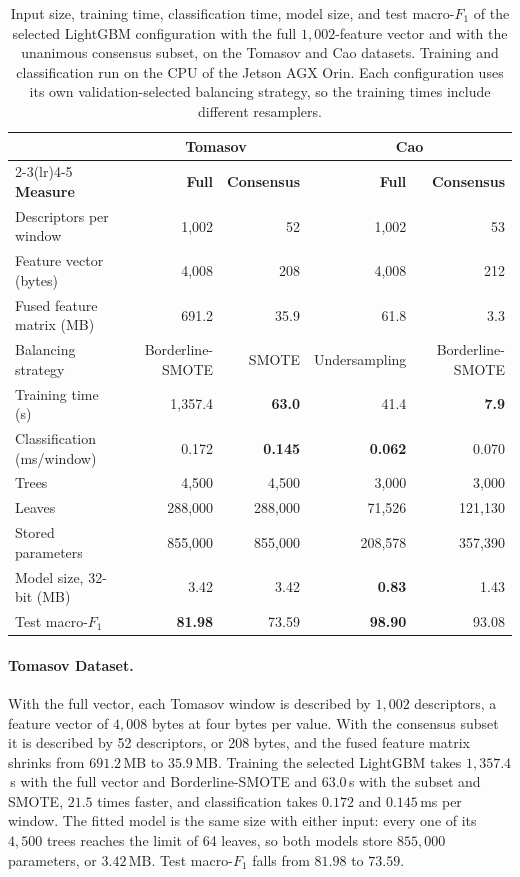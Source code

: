 \begin{table}[!htbp]
	\centering
	\caption{Input size, training time, classification time, model size, and test macro-$F_1$ of the selected LightGBM configuration with the full $1{,}002$-feature vector and with the unanimous consensus subset, on the Tomasov and Cao datasets. Training and classification run on the CPU of the Jetson AGX Orin. Each configuration uses its own validation-selected balancing strategy, so the training times include different resamplers.}
	\label{tab:selection_footprint}
	\footnotesize
	\setlength{\tabcolsep}{3.5pt}
	\begin{tabular}{@{}lrrrr@{}}
		\toprule
		& \multicolumn{2}{c}{\textbf{Tomasov}} & \multicolumn{2}{c}{\textbf{Cao}}\\
		\cmidrule(lr){2-3}\cmidrule(lr){4-5}
		\textbf{Measure} & \textbf{Full} & \textbf{Consensus} & \textbf{Full} & \textbf{Consensus}\\
		\midrule
		Descriptors per window      & 1{,}002 & 52 & 1{,}002 & 53\\
		Feature vector (bytes)      & 4{,}008 & 208 & 4{,}008 & 212\\
		Fused feature matrix (MB)   & 691.2 & 35.9 & 61.8 & 3.3\\
		Balancing strategy          & Borderline-SMOTE & SMOTE & Undersampling & Borderline-SMOTE\\
		Training time (s)           & 1{,}357.4 & \textbf{63.0} & 41.4 & \textbf{7.9}\\
		Classification (ms/window) & 0.172 & \textbf{0.145} & \textbf{0.062} & 0.070\\
		Trees                       & 4{,}500 & 4{,}500 & 3{,}000 & 3{,}000\\
		Leaves                      & 288{,}000 & 288{,}000 & 71{,}526 & 121{,}130\\
		Stored parameters           & 855{,}000 & 855{,}000 & 208{,}578 & 357{,}390\\
		Model size, 32-bit (MB)            & 3.42 & 3.42 & \textbf{0.83} & 1.43\\
		Test macro-$F_1$                   & \textbf{81.98} & 73.59 & \textbf{98.90} & 93.08\\
		\bottomrule
	\end{tabular}
\end{table}

\paragraph[Tomasov Dataset]{Tomasov Dataset.}
With the full vector, each Tomasov window is described by $1{,}002$ descriptors, a feature vector of $4{,}008$ bytes at four bytes per value. With the consensus subset it is described by 52 descriptors, or 208 bytes, and the fused feature matrix shrinks from $691.2$\,MB to $35.9$\,MB. Training the selected LightGBM takes $1{,}357.4$\,s with the full vector and Borderline-SMOTE and $63.0$\,s with the subset and SMOTE, $21.5$ times faster, and classification takes $0.172$ and $0.145$\,ms per window. The fitted model is the same size with either input: every one of its $4{,}500$ trees reaches the limit of 64 leaves, so both models store $855{,}000$ parameters, or $3.42$\,MB. Test macro-$F_1$ falls from $81.98$ to $73.59$.

